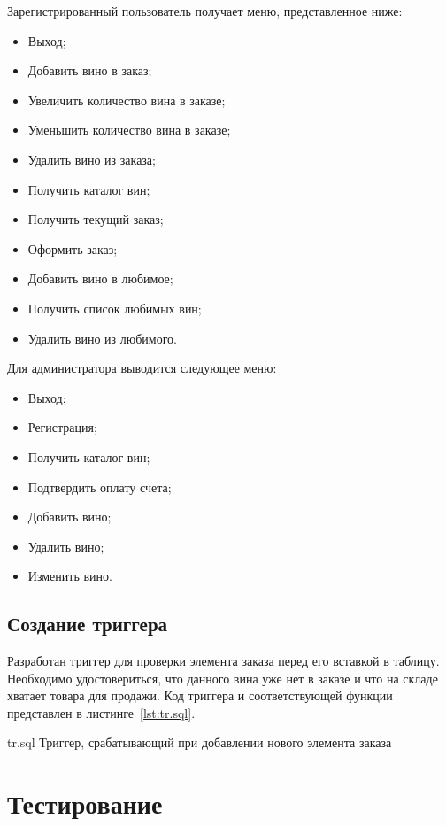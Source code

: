 Зарегистрированный пользователь получает меню, представленное ниже:
\begin{itemize}[label*=---]
	\item Выход;
	\item Добавить вино в заказ;
        \item Увеличить количество вина в заказе;
        \item Уменьшить количество вина в заказе;
        \item Удалить вино из заказа;
        \item Получить каталог вин;
        \item Получить текущий заказ;
        \item Оформить заказ;
        \item Добавить вино в любимое;
        \item Получить список любимых вин;
        \item Удалить вино из любимого.
\end{itemize}

Для администратора выводится следующее меню:
\begin{itemize}[label*=---]
	\item Выход;
        \item Регистрация;
        \item Получить каталог вин;
        \item Подтвердить оплату счета;
        \item Добавить вино;
        \item Удалить вино;
        \item Изменить вино.
\end{itemize}


 \subsection{Создание триггера}

 Разработан триггер для проверки элемента заказа перед его вставкой в таблицу. Необходимо удостовериться, что данного вина уже нет в заказе и что на складе хватает товара для продажи. Код триггера и соответствующей функции представлен в листинге~\ref{lst:tr.sql}. 

{tr.sql} %
{Триггер, срабатывающий при добавлении нового элемента заказа} %

 \section{Тестирование}

